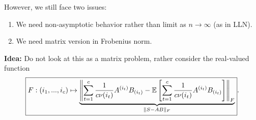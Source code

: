 However, we still face two issues:%
\begin{enumerate}[itemsep=0pt]
	\item We need non-asymptotic behavior rather than limit as $n\to\infty$ (as in LLN).
	\item We need matrix version in Frobenius norm.
\end{enumerate}
\textbf{Idea:} Do not look at this as a matrix problem, rather consider the real-valued function
\begin{equation} \label{eq2.9:functionf}
\boxed{F:(i_1,...,i_c) \mapsto \underbrace{\left\|
\sum_{t=1}^c \frac{1}{c\nu(i_t)}A^{(i_t)} B_{(i_t)} - \mathbb{E} \left[\sum_{t=1}^c \frac{1}{c\nu(i_t)}A^{(i_t)} B_{(i_t)}
\right] \right\|_F}_{\|S-AB\|_F}}.
\end{equation}

